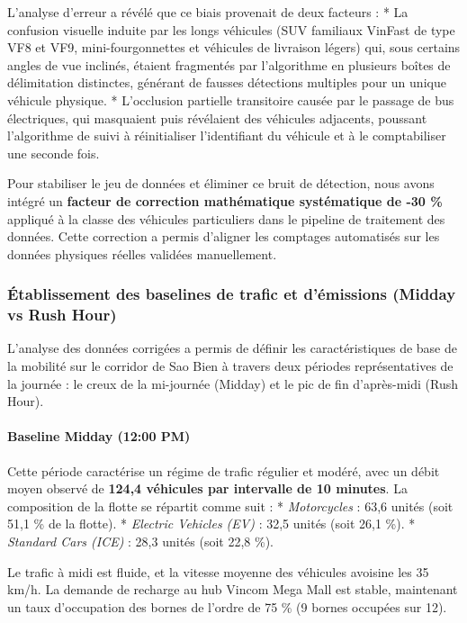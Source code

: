 \documentclass[10pt, a4paper]{article}
\begin{document}
L'analyse d'erreur a révélé que ce biais provenait de deux facteurs : *
La confusion visuelle induite par les longs véhicules (SUV familiaux
VinFast de type VF8 et VF9, mini-fourgonnettes et véhicules de livraison
légers) qui, sous certains angles de vue inclinés, étaient fragmentés
par l'algorithme en plusieurs boîtes de délimitation distinctes,
générant de fausses détections multiples pour un unique véhicule
physique. * L'occlusion partielle transitoire causée par le passage de
bus électriques, qui masquaient puis révélaient des véhicules adjacents,
poussant l'algorithme de suivi à réinitialiser l'identifiant du véhicule
et à le comptabiliser une seconde fois.

Pour stabiliser le jeu de données et éliminer ce bruit de détection,
nous avons intégré un \textbf{facteur de correction mathématique
systématique de -30 \%} appliqué à la classe des véhicules particuliers
dans le pipeline de traitement des données. Cette correction a permis
d'aligner les comptages automatisés sur les données physiques réelles
validées manuellement.

\subsubsection{Établissement des baselines de trafic et d'émissions
(Midday vs Rush
Hour)}\label{uxe9tablissement-des-baselines-de-trafic-et-duxe9missions-midday-vs-rush-hour}

L'analyse des données corrigées a permis de définir les caractéristiques
de base de la mobilité sur le corridor de Sao Bien à travers deux
périodes représentatives de la journée : le creux de la mi-journée
(Midday) et le pic de fin d'après-midi (Rush Hour).

\paragraph{Baseline Midday (12:00 PM)}\label{baseline-midday-1200-pm}

Cette période caractérise un régime de trafic régulier et modéré, avec
un débit moyen observé de \textbf{124,4 véhicules par intervalle de 10
minutes}. La composition de la flotte se répartit comme suit : *
\emph{Motorcycles} : 63,6 unités (soit 51,1 \% de la flotte). *
\emph{Electric Vehicles (EV)} : 32,5 unités (soit 26,1 \%). *
\emph{Standard Cars (ICE)} : 28,3 unités (soit 22,8 \%).

Le trafic à midi est fluide, et la vitesse moyenne des véhicules
avoisine les 35 km/h. La demande de recharge au hub Vincom Mega Mall est
stable, maintenant un taux d'occupation des bornes de l'ordre de 75 \%
(9 bornes occupées sur 12).
\end{document}
